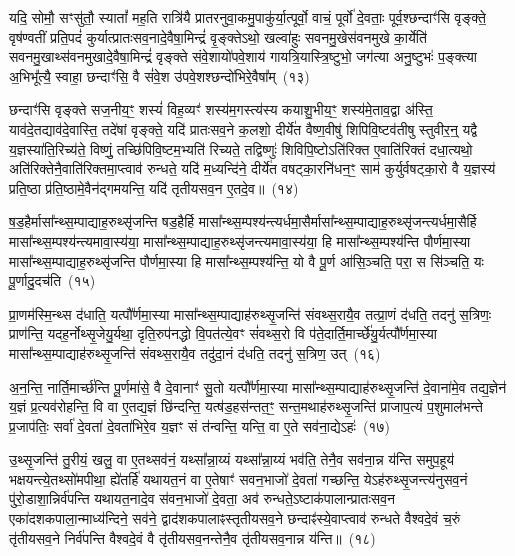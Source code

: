 {\anuvakamend[{आ॒दि॒त्यस्तस्यै॒व द्वे च॑}]}%

यदि॒ सोमौ॒ सꣳसु॑तौ॒ स्यातां᳚ मह॒ति रात्रि॑यै प्रातरनुवा॒कमु॒पाकु॑र्या॒त्पूर्वो॒ वाचं॒ पूर्वो॑ दे॒वताः॒ पूर्व॒श्छन्दाꣳ॑सि वृङ्क्ते॒ वृष॑ण्वतीं प्रति॒पदं॑ कुर्यात्प्रातःसव॒नादे॒वैषा॒मिन्द्रं॑ वृ॒ङ्क्ते\-ऽथो॒ खल्वा॑हुः सवनमु॒खेस॑वनमुखे का॒र्येति॑ सवनमु॒खाथ्स॑वनमुखादे॒वैषा॒मिन्द्रं॑ वृङ्क्ते संवे॒शायो॑पवे॒शाय॑ गायत्रि॒यास्त्रि॒ष्टुभो॒ जग॑त्या अनु॒ष्टुभः॑ प॒ङ्क्त्या अ॒भिभू᳚त्यै॒ स्वाहा॒ छन्दाꣳ॑सि॒ वै सं॑वे॒श उ॑पवे॒शश्छन्दो॑भिरे॒वैषा᳚म्~(१३)

छन्दाꣳ॑सि वृङ्क्ते सज॒नीय॒ꣳ॒ शस्यं॑ विह॒व्यꣳ॑ शस्य॑म॒गस्त्य॑स्य कयाशु॒भीय॒ꣳ॒ शस्य॑मे॒ताव॒द्वा अ॑स्ति॒ याव॑दे॒तद्याव॑दे॒वास्ति॒ तदे॑षां वृङ्क्ते॒ यदि॑ प्रातःसव॒ने क॒लशो॒ दीर्ये॑त वैष्ण॒वीषु॑ शिपिवि॒ष्टव॑तीषु स्तुवीर॒न्॒ यद्वै य॒ज्ञस्या॑ति॒रिच्य॑ते॒ विष्णुं॒ तच्छि॑पिवि॒ष्टम॒भ्यति॑ रिच्यते॒ तद्विष्णुः॑ शिविपि॒ष्टो\-ऽति॑रिक्त ए॒वाति॑रिक्तं दधा॒त्यथो॒ अति॑रिक्तेनै॒वाति॑रिक्तमा॒प्त्वाव॑ रुन्धते॒ यदि॑ म॒ध्यन्दि॑ने॒ दीर्ये॑त वषट्का॒रनि॑धन॒ꣳ॒ साम॑ कुर्युर्वषट्का॒रो वै य॒ज्ञस्य॑ प्रति॒ष्ठा प्र॑ति॒ष्ठामे॒वैन॑द्गमयन्ति॒ यदि॑ तृतीयसव॒न ए॒तदे॒व॥~(१४)


{\anuvakamend[{छन्दो॑भिरे॒वैषा॒मवैका॒न्नविꣳ॑श॒तिश्च॑}]}%

ष॒ड॒हैर्मासा᳚न्थ्स॒म्पाद्याह॒रुथ्सृ॑जन्ति षड॒हैर्\mbox{}हि मासा᳚न्थ्स॒म्पश्य॑न्त्यर्धमा॒सैर्मासा᳚न्थ्स॒म्पाद्याह॒रुथ्सृ॑जन्त्यर्धमा॒सैर्\mbox{}हि मासा᳚न्थ्स॒म्पश्य॑न्त्यमावा॒स्य॑या॒ मासा᳚न्थ्स॒म्पाद्याह॒रुथ्सृ॑जन्त्यमावा॒स्य॑या॒ हि मासा᳚न्थ्स॒म्पश्य॑न्ति पौर्णमा॒स्या मासा᳚न्थ्स॒म्पाद्याह॒रुथ्सृ॑जन्ति पौर्णमा॒स्या हि मासा᳚न्थ्स॒म्पश्य॑न्ति॒ यो वै पू॒र्ण आ॑सि॒ञ्चति॒ परा॒ स सि॑ञ्चति॒ यः पू॒र्णादु॒दच॑ति~(१५)

प्रा॒णम॑स्मि॒न्थ्स द॑धाति॒ यत्पौ᳚र्णमा॒स्या मासा᳚न्थ्स॒म्पाद्याह॑रुथ्सृ॒जन्ति॑ संवथ्स॒रायै॒व तत्प्रा॒णं द॑धति॒ तदनु॑ स॒त्रिणः॒ प्राण॑न्ति॒ यदह॒र्नोथ्सृ॒जेयु॒र्यथा॒ दृति॒रुप॑नद्धो वि॒पत॑त्ये॒वꣳ सं॑वथ्स॒रो वि प॑ते॒दार्ति॒मार्च्छे॑यु॒र्यत्पौ᳚र्णमा॒स्या मासा᳚न्थ्स॒म्पाद्याह॑रुथ्सृ॒जन्ति॑ संवथ्स॒रायै॒व तदु॑दा॒नं द॑धति॒ तदनु॑ स॒त्रिण॒ उत्~(१६)

अ॒न॒न्ति॒ नार्ति॒मार्च्छ॑न्ति पू॒र्णमा॑से॒ वै दे॒वानाꣳ॑ सु॒तो यत्पौ᳚र्णमा॒स्या मासा᳚न्थ्स॒म्पाद्याह॑रुथ्सृ॒जन्ति॑ दे॒वाना॑मे॒व तद्य॒ज्ञेन॑ य॒ज्ञं प्र॒त्यव॑रोहन्ति॒ वि वा ए॒तद्य॒ज्ञं छि॑न्दन्ति॒ यत्ष॑ड॒हस॑न्तत॒ꣳ॒ सन्त॒मथाह॑रुथ्सृ॒जन्ति॑ प्राजाप॒त्यं प॒शुमाल॑भन्ते प्र॒जा\-प॑तिः॒ सर्वा॑ दे॒वता॑ दे॒वता॑भिरे॒व य॒ज्ञꣳ सं त॑न्वन्ति॒ यन्ति॒ वा ए॒ते सव॑ना॒द्ये\-ऽहः॑~(१७)

उ॒थ्सृ॒जन्ति॑ तु॒रीयं॒ खलु॒ वा ए॒तथ्सव॑नं॒ यथ्सा᳚न्ना॒य्यं यथ्सा᳚न्ना॒य्यं भव॑ति॒ तेनै॒व सव॑ना॒न्न य॑न्ति समुप॒हूय॑ भक्षयन्त्ये॒तथ्सो॑मपीथा॒ ह्ये॑तर्\mbox{}हि॑ यथायत॒नं वा ए॒तेषाꣳ॑ सवन॒भाजो॑ दे॒वता॑ गच्छन्ति॒ ये\-ऽह॑रुथ्सृ॒जन्त्य॑नुसव॒नं पु॑रो॒डाशा॒न्निर्व॑पन्ति यथायत॒नादे॒व स॑वन॒भाजो॑ दे॒वता॒ अव॑ रुन्धते॒\-ऽष्टाक॑पालान्प्रातःसव॒न एका॑\-दश\-कपाला॒\-न्माध्य॑न्दिने॒ सव॑ने॒ द्वाद॑श\-कपालाꣴस्तृतीयसव॒ने छन्दाꣴ॑स्ये॒वाप्त्वाव॑ रुन्धते वैश्वदे॒वं च॒रुं तृ॑तीयसव॒ने निर्व॑पन्ति वैश्वदे॒वं वै तृ॑तीयसव॒नन्तेनै॒व तृ॑तीयसव॒नान्न य॑न्ति॥~(१८)

